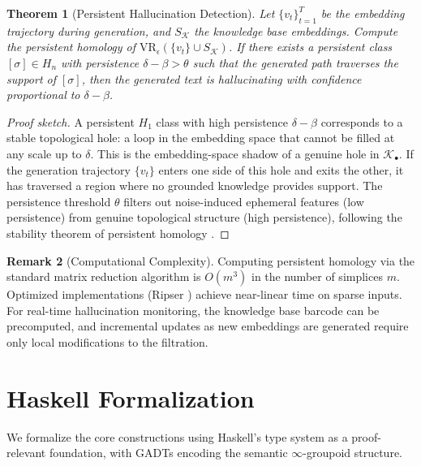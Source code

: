 \documentclass[11pt,a4paper]{article}
\theoremstyle{plain}
\newtheorem{theorem}{Theorem}[section]
\theoremstyle{definition}
\newtheorem{remark}[theorem]{Remark}
\newcommand{\VR}{\mathrm{VR}}
\begin{document}
\begin{theorem}[Persistent Hallucination Detection]\label{thm:persistent-detect}
Let $\{v_t\}_{t=1}^T$ be the embedding trajectory during generation, and $S_{\mathcal{K}}$ the knowledge base embeddings. Compute the persistent homology of $\VR_\epsilon(\{v_t\} \cup S_{\mathcal{K}})$. If there exists a persistent class $[\sigma] \in H_n$ with persistence $\delta - \beta > \theta$ such that the generated path traverses the support of $[\sigma]$, then the generated text is hallucinating with confidence proportional to $\delta - \beta$.
\end{theorem}

\begin{proof}[Proof sketch]
A persistent $H_1$ class with high persistence $\delta - \beta$ corresponds to a stable topological hole: a loop in the embedding space that cannot be filled at any scale up to $\delta$. This is the embedding-space shadow of a genuine hole in $\mathcal{K}_\bullet$. If the generation trajectory $\{v_t\}$ enters one side of this hole and exits the other, it has traversed a region where no grounded knowledge provides support. The persistence threshold $\theta$ filters out noise-induced ephemeral features (low persistence) from genuine topological structure (high persistence), following the stability theorem of persistent homology \cite{edelsbrunner2010computational}.
\end{proof}

\begin{remark}[Computational Complexity]
Computing persistent homology via the standard matrix reduction algorithm is $O(m^3)$ in the number of simplices $m$. Optimized implementations (Ripser \cite{bauer2021ripser}) achieve near-linear time on sparse inputs. For real-time hallucination monitoring, the knowledge base barcode can be precomputed, and incremental updates as new embeddings are generated require only local modifications to the filtration.
\end{remark}

\section{Haskell Formalization}\label{sec:haskell}

We formalize the core constructions using Haskell's type system as a proof-relevant foundation, with GADTs encoding the semantic $\infty$-groupoid structure.
\end{document}
